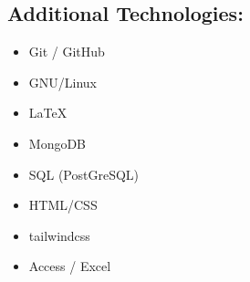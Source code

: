 \documentclass[9pt]{extarticle}
\begin{document}
\begin{minipage}{0.3\textwidth}
\begin{tcolorbox}[colback=grey]
\begin{itemize}[leftmargin=*]
		\end{itemize}

		\subsection{Additional Technologies:}
		\begin{itemize}[leftmargin=*]
			\item Git / GitHub
			\item GNU/Linux
			\item LaTeX
			\item MongoDB
			\item SQL (PostGreSQL)
			\item HTML/CSS
			\item tailwindcss
			\item Access / Excel
		\end{itemize}

	\end{tcolorbox}

\end{minipage}
\end{document}
